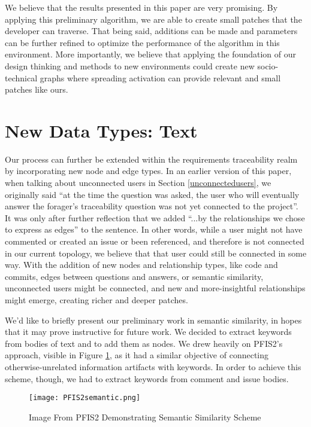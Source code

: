 We believe that the results presented in this paper are very promising. By applying this preliminary algorithm, we are able to create small patches that the developer can traverse. That being said, additions can be made and parameters can be further refined to optimize the performance of the algorithm in this environment. More importantly, we believe that applying the foundation of our design thinking and methods to new environments could create new socio-technical graphs where spreading activation can provide relevant and small patches like ours.

\section{New Data Types: Text}
Our process can further be extended within the requirements traceability realm by incorporating new node and edge types. In an earlier version of this paper, when talking about unconnected users in Section \ref{unconnectedusers}, we originally said ``at the time the question was asked, the user who will eventually answer the forager's traceability question was not yet connected to the project''. It was only after further reflection that we added ``...by the relationships we chose to express as edges'' to the sentence. In other words, while a user might not have commented or created an issue or been referenced, and therefore is not connected in our current topology, we believe that that user could still be connected in some way. With the addition of new nodes and relationship types, like code and commits, edges between questions and answers, or semantic similarity, unconnected users might be connected, and new and more-insightful relationships might emerge, creating richer and deeper patches.

We'd like to briefly present our preliminary work in semantic similarity, in hopes that it may prove instructive for future work. We decided to extract keywords from bodies of text and to add them as nodes. We drew heavily on PFIS2's approach, visible in Figure \ref{fig:pfis2semantic}, as it had a similar objective of connecting otherwise-unrelated information artifacts with keywords. In order to achieve this scheme, though, we had to extract keywords from comment and issue bodies.

\begin{figure}[ht]
	\centering
	\texttt{[image: PFIS2semantic.png]}
	\caption{Image From PFIS2 \cite{pfis2} Demonstrating Semantic Similarity Scheme}
	\label{fig:pfis2semantic}
\end{figure}

